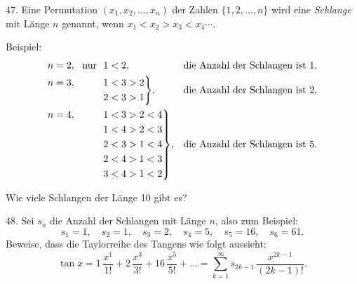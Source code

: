 \begin{problem}{47.}
	Eine Permutation $(x_1,x_2, \dotsc,x_n)$ der Zahlen $\{1, 2, \dotsc, n\}$ wird eine
	\emph{Schlange} mit Länge $n$ genannt, wenn $x_1<x_2>x_3<x_4 \dotsb$.

	\begin{note}{Beispiel:}
		\begin{equation*}
			\begin{aligned}[t]
				&\begin{aligned}[t] n=2, \text{\ \ nur\ \ } 1<2, \end{aligned} &&\text{die Anzahl der Schlangen ist }1, \\
				&\hskip-\nulldelimiterspace\mathord{\left.\begin{aligned} n=3, \hphantom{\text{\ \ nur\ \ }} 1&<3>2 \\ 
				2&<3>1\end{aligned} \right\}}, && \text{die Anzahl der Schlangen ist }2, \\
				&\hskip-\nulldelimiterspace\mathord{\left.\begin{aligned} n=4, \hphantom{\text{\ \ nur\ \ }} 1&<3>2<4 \\ 
				1&<4>2<3 \\ 
				2&<3>1<4 \\ 
				2&<4>1<3 \\ 
				3&<4>1<2\end{aligned} \right\}},
				&&\text{die Anzahl der Schlangen ist }5. \\
			\end{aligned}
		\end{equation*}
	\end{note}
	Wie viele Schlangen der Länge 10 gibt es?
\end{problem}

\begin{problem}{48.}
	Sei $s_n$ die Anzahl der Schlangen mit Länge $n$, also zum Beispiel: 
	\begin{equation*}
		s_1=1, \quad s_2=1, \quad s_3=2, \quad s_4=5, \quad s_5=16, \quad s_6=61.
	\end{equation*}
	Beweise, dass die Taylorreihe des Tangens wie folgt aussieht: 
	\begin{equation*}
		\tan x=1\, \frac{x^1}{1!}+2\, \frac{x^3}{3!}+16\, \frac{x^5}{5!}+\dots=
		\textstyle\sum\limits_{k=1}^{\infty} s_{2k-1}\, \frac{x^{2k-1}}{(2k-1)!}.
	\end{equation*}
\end{problem}

